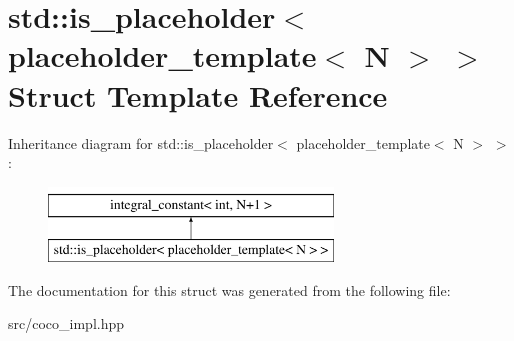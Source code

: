 \hypertarget{structstd_1_1is__placeholder_3_01placeholder__template_3_01_n_01_4_01_4}{}\section{std\+:\+:is\+\_\+placeholder$<$ placeholder\+\_\+template$<$ N $>$ $>$ Struct Template Reference}
\label{structstd_1_1is__placeholder_3_01placeholder__template_3_01_n_01_4_01_4}
Inheritance diagram for std\+:\+:is\+\_\+placeholder$<$ placeholder\+\_\+template$<$ N $>$ $>$\+:\begin{figure}[H]
\begin{center}
\leavevmode
\includegraphics[height=2.000000cm]{structstd_1_1is__placeholder_3_01placeholder__template_3_01_n_01_4_01_4}
\end{center}
\end{figure}


The documentation for this struct was generated from the following file\+:\begin{DoxyCompactItemize}
\item 
src/coco\+\_\+impl.\+hpp\end{DoxyCompactItemize}
